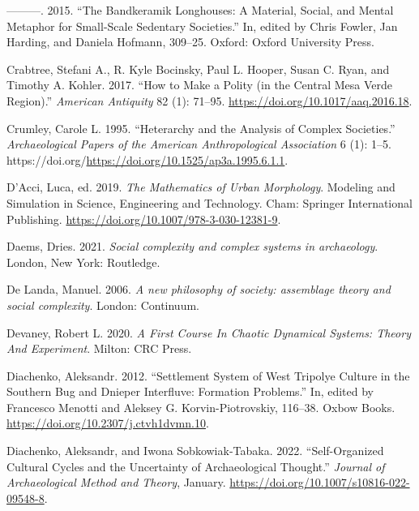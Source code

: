 \documentclass[
  12pt,
  a4paper, twoside]{book}
\newlength{\cslhangindent}
\newlength{\cslentryspacingunit} %
\newenvironment{CSLReferences}[2] %
 {%
  \setlength{\parindent}{0pt}
  \ifodd #1
  \let\oldpar\par
  \def\par{\hangindent=\cslhangindent\oldpar}
  \fi
  \setlength{\parskip}{#2\cslentryspacingunit}
 }%
 {}
\begin{document}
\begin{CSLReferences}{1}{0}
\leavevmode{}%
---------. 2015. {``The Bandkeramik Longhouses: A Material, Social, and Mental Metaphor for Small-Scale Sedentary Societies.''} In, edited by Chris Fowler, Jan Harding, and Daniela Hofmann, 309--25. Oxford: Oxford University Press.

\leavevmode{}%
Crabtree, Stefani A., R. Kyle Bocinsky, Paul L. Hooper, Susan C. Ryan, and Timothy A. Kohler. 2017. {``How to Make a Polity (in the Central Mesa Verde Region).''} \emph{American Antiquity} 82 (1): 71--95. \url{https://doi.org/10.1017/aaq.2016.18}.

\leavevmode{}%
Crumley, Carole L. 1995. {``Heterarchy and the Analysis of Complex Societies.''} \emph{Archaeological Papers of the American Anthropological Association} 6 (1): 1--5. https://doi.org/\url{https://doi.org/10.1525/ap3a.1995.6.1.1}.

\leavevmode{}%
D'Acci, Luca, ed. 2019. \emph{The Mathematics of Urban Morphology}. Modeling and Simulation in Science, Engineering and Technology. Cham: Springer International Publishing. \url{https://doi.org/10.1007/978-3-030-12381-9}.

\leavevmode{}%
Daems, Dries. 2021. \emph{Social complexity and complex systems in archaeology}. London, New York: Routledge.

\leavevmode{}%
De Landa, Manuel. 2006. \emph{A new philosophy of society: assemblage theory and social complexity}. London: Continuum.

\leavevmode{}%
Devaney, Robert L. 2020. \emph{A First Course In Chaotic Dynamical Systems: Theory And Experiment}. Milton: CRC Press.

\leavevmode{}%
Diachenko, Aleksandr. 2012. {``Settlement System of West Tripolye Culture in the Southern Bug and Dnieper Interfluve: Formation Problems.''} In, edited by Francesco Menotti and Aleksey G. Korvin-Piotrovskiy, 116--38. Oxbow Books. \url{https://doi.org/10.2307/j.ctvh1dvmn.10}.

\leavevmode{}%
Diachenko, Aleksandr, and Iwona Sobkowiak-Tabaka. 2022. {``Self-{Organized Cultural Cycles} and the {Uncertainty} of {Archaeological Thought}.''} \emph{Journal of Archaeological Method and Theory}, January. \url{https://doi.org/10.1007/s10816-022-09548-8}.


\end{CSLReferences}
\end{document}
